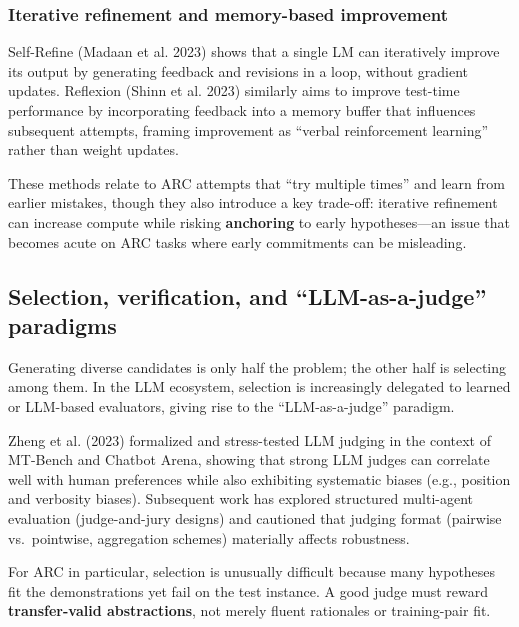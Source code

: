 \documentclass[11pt]{article}
\begin{document}
\hypertarget{iterative-refinement-and-memory-based-improvement}{%
\subsubsection{Iterative refinement and memory-based
improvement}\label{iterative-refinement-and-memory-based-improvement}}

Self-Refine (Madaan et al. 2023) shows that a single LM can iteratively
improve its output by generating feedback and revisions in a loop,
without gradient updates. Reflexion (Shinn et al. 2023) similarly aims
to improve test-time performance by incorporating feedback into a memory
buffer that influences subsequent attempts, framing improvement as
``verbal reinforcement learning'' rather than weight updates.

These methods relate to ARC attempts that ``try multiple times'' and
learn from earlier mistakes, though they also introduce a key trade-off:
iterative refinement can increase compute while risking
\textbf{anchoring} to early hypotheses---an issue that becomes acute on
ARC tasks where early commitments can be misleading.

\hypertarget{selection-verification-and-llm-as-a-judge-paradigms}{%
\subsection{Selection, verification, and ``LLM-as-a-judge''
paradigms}\label{selection-verification-and-llm-as-a-judge-paradigms}}

Generating diverse candidates is only half the problem; the other half
is selecting among them. In the LLM ecosystem, selection is increasingly
delegated to learned or LLM-based evaluators, giving rise to the
``LLM-as-a-judge'' paradigm.

Zheng et al. (2023) formalized and stress-tested LLM judging in the
context of MT-Bench and Chatbot Arena, showing that strong LLM judges
can correlate well with human preferences while also exhibiting
systematic biases (e.g., position and verbosity biases). Subsequent work
has explored structured multi-agent evaluation (judge-and-jury designs)
and cautioned that judging format (pairwise vs.~pointwise, aggregation
schemes) materially affects robustness.

For ARC in particular, selection is unusually difficult because many
hypotheses fit the demonstrations yet fail on the test instance. A good
judge must reward \textbf{transfer-valid abstractions}, not merely
fluent rationales or training-pair fit.
\end{document}
